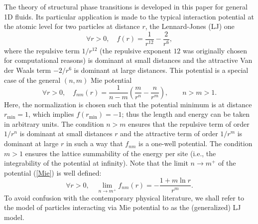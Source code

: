 \documentclass[12pt]{iopart}
\theoremstyle{definition}
\begin{document}
The theory of structural phase transitions is developed
in this paper for general 1D fluids.
Its particular application is made to the typical interaction potential at
the atomic level for two particles at distance $r$,
the Lennard-Jones (LJ) one \cite{Lennard31}
\begin{equation} \label{LJ}
\forall r>0,\quad f(r) = \frac{1}{r^{12}} - \frac{2}{r^6} , 
\end{equation}
where the repulsive term $1/r^{12}$ (the repulsive exponent $12$ was
originally chosen for computational reasons) is dominant at small
distances and the attractive Van der Waals term $-2/r^6$ is dominant
at large distances.
This potential is a special case of the general $(n,m)$ Mie potential
\cite{Mie03}
\begin{equation} \label{Mie}
\forall r>0,\quad f_{nm}(r) = \frac{1}{n-m} \left(
\frac{m}{r^n}-\frac{n}{r^m} \right), \qquad n>m>1. 
\end{equation}
Here, the normalization is chosen such that the potential minimum is at
distance $r_{\min}=1$, which implies $f(r_{\min})=-1$; thus the length and energy
can be taken in arbitrary units.
The condition $n>m$ ensures that the repulsive term of order $1/r^n$
is dominant at small distances $r$ and the attractive term of order $1/r^m$
is dominant at large $r$ in such a way that $f_{nm}$ is a one-well potential.
The condition $m>1$ ensures the lattice summability of the energy
per site (i.e., the integrability of the potential at infinity).
Note that the limit $n\to m^+$ of the potential (\ref{Mie}) is well defined:
\begin{equation} \label{Miemm}
\forall r>0,\quad \lim_{n\to m^+} f_{nm}(r) = - \frac{1+m\ln r}{r^m} .
\end{equation}  
To avoid confusion with the contemporary physical literature, we shall
refer to the model of particles interacting via Mie potential to as
the (generalized) LJ model.
\end{document}
